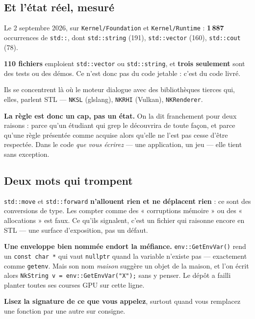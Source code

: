 \subsection{Et l'état réel, mesuré}

\begin{nkpiege}
Le 2 septembre 2026, sur \texttt{Kernel/Foundation} et \texttt{Kernel/Runtime} :
\textbf{1\,887} occurrences de \texttt{std::}, dont \texttt{std::string} (191),
\texttt{std::vector} (160), \texttt{std::cout} (78).

\textbf{110 fichiers} emploient \texttt{std::vector} ou \texttt{std::string}, et
\textbf{trois seulement} sont des tests ou des démos. Ce n'est donc pas du code
jetable : c'est du code livré.

Ils se concentrent là où le moteur dialogue avec des bibliothèques tierces qui,
elles, parlent STL --- \texttt{NKSL} (glslang), \texttt{NKRHI} (Vulkan),
\texttt{NKRenderer}.

\textbf{La règle est donc un cap, pas un état.} On la dit franchement pour deux
raisons : parce qu'un étudiant qui grep le découvrira de toute façon, et parce
qu'une règle présentée comme acquise alors qu'elle ne l'est pas cesse d'être
respectée. Dans le code \emph{que vous écrirez} --- une application, un jeu ---
elle tient sans exception.
\end{nkpiege}

\subsection{Deux mots qui trompent}

\begin{nkpiege}
\texttt{std::move} et \texttt{std::forward} \textbf{n'allouent rien et ne
déplacent rien} : ce sont des conversions de type. Les compter comme des
« corruptions mémoire » ou des « allocations » est faux. Ce qu'ils signalent,
c'est un fichier qui raisonne encore en STL --- une surface d'exposition, pas un
défaut.
\end{nkpiege}

\begin{nkpiege}
\textbf{Une enveloppe bien nommée endort la méfiance.} \texttt{env::GetEnvVar()}
rend un \texttt{const char *} qui vaut \texttt{nullptr} quand la variable
n'existe pas --- exactement comme \texttt{getenv}. Mais son nom \emph{maison}
suggère un objet de la maison, et l'on écrit alors
\texttt{NkString v = env::GetEnvVar("X");} sans y penser. Le dépôt a failli
planter toutes ses courses GPU sur cette ligne.

\textbf{Lisez la signature de ce que vous appelez}, surtout quand vous remplacez
une fonction par une autre sur consigne.
\end{nkpiege}

